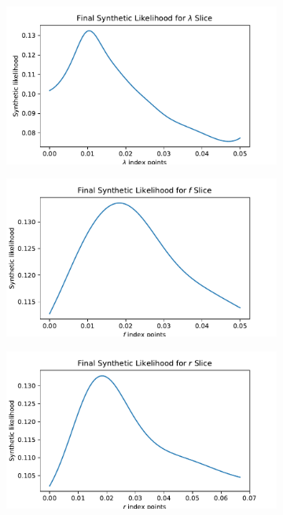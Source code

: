 \begin{figure}[htbp]
\begin{subfigure}[b]{0.5\textwidth}
    \end{subfigure}%
    \hfill%
    \begin{subfigure}[b]{0.5\textwidth}
        \centering
        \includegraphics[width=\textwidth]{../champagne_GP_images/lambda_slice_500_synth_likelihood.pdf}
    \end{subfigure}
    \begin{subfigure}[b]{0.5\textwidth}
        \centering
        \includegraphics[width=\textwidth]{../champagne_GP_images/f_slice_500_synth_likelihood.pdf}
    \end{subfigure}%
    \hfill%
    \begin{subfigure}[b]{0.5\textwidth}
        \centering
        \includegraphics[width=\textwidth]{../champagne_GP_images/r_slice_500_synth_likelihood.pdf}

\end{subfigure}
\end{figure}

